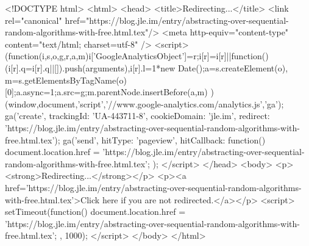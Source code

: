 <!DOCTYPE html>
<html>
<head>
<title>Redirecting...</title>
<link rel="canonical" href="https://blog.jle.im/entry/abstracting-over-sequential-random-algorithms-with-free.html.tex"/>
<meta http-equiv="content-type" content="text/html; charset=utf-8" />
<script>
(function(i,s,o,g,r,a,m){i['GoogleAnalyticsObject']=r;i[r]=i[r]||function(){
(i[r].q=i[r].q||[]).push(arguments)},i[r].l=1*new Date();a=s.createElement(o),
m=s.getElementsByTagName(o)[0];a.async=1;a.src=g;m.parentNode.insertBefore(a,m)
})(window,document,'script','//www.google-analytics.com/analytics.js','ga');
ga('create', { trackingId: 'UA-443711-8', cookieDomain: 'jle.im', redirect: 'https://blog.jle.im/entry/abstracting-over-sequential-random-algorithms-with-free.html.tex'});
ga('send', { hitType: 'pageview', hitCallback: function() { document.location.href = 'https://blog.jle.im/entry/abstracting-over-sequential-random-algorithms-with-free.html.tex'; } });
</script>
</head>
<body>
  <p><strong>Redirecting...</strong></p>
  <p><a href='https://blog.jle.im/entry/abstracting-over-sequential-random-algorithms-with-free.html.tex'>Click here if you are not redirected.</a></p>
  <script>
    setTimeout(function() { document.location.href = 'https://blog.jle.im/entry/abstracting-over-sequential-random-algorithms-with-free.html.tex'; }, 1000);
  </script>
</body>
</html>
